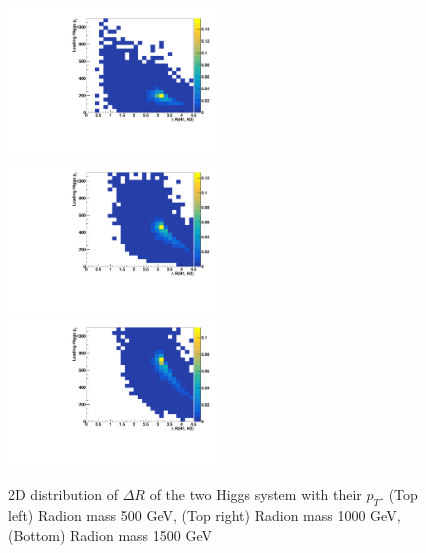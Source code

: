\begin{figure}[htb]
  \centering
  \includegraphics[width=0.5\textwidth]{Images/ResonantHH/gen_deltaR_H1_H2_Vs_LeadingH_PT_M0500.pdf}%
  \includegraphics[width=0.5\textwidth]{Images/ResonantHH/gen_deltaR_H1_H2_Vs_LeadingH_PT_M1000.pdf}\\
  \includegraphics[width=0.5\textwidth]{Images/ResonantHH/gen_deltaR_H1_H2_Vs_LeadingH_PT_M1500.pdf}
\caption{2D distribution of $\Delta R$ of the two Higgs system with their $p_T$. (Top left) Radion mass 500 GeV, (Top right) Radion mass 1000 GeV, (Bottom) Radion mass 1500 GeV} \label{fig:diagram}
\end{figure}

